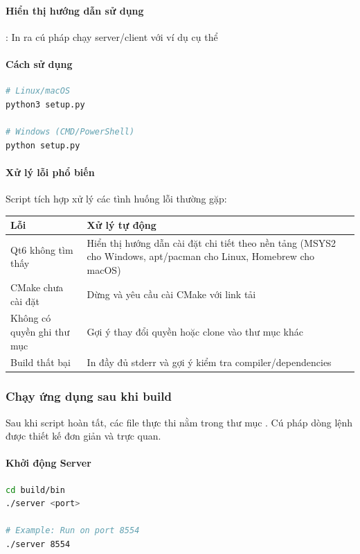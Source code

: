 \paragraph*{Hiển thị hướng dẫn sử dụng}: In ra cú pháp chạy server/client với ví dụ cụ thể

\paragraph*{Cách sử dụng}
\noindent

\begin{lstlisting}[language=bash, caption={Chạy script setup tự động}, label={lst:setup_script}]
# Linux/macOS
python3 setup.py

# Windows (CMD/PowerShell)
python setup.py
\end{lstlisting}

\paragraph{Xử lý lỗi phổ biến}
\noindent
Script tích hợp xử lý các tình huống lỗi thường gặp:

\noindent
\small
\begin{tabular}{p{}p{}}
\toprule
\textbf{Lỗi} & \textbf{Xử lý tự động} \\
\midrule
Qt6 không tìm thấy & Hiển thị hướng dẫn cài đặt chi tiết theo nền tảng (MSYS2 cho Windows, apt/pacman cho Linux, Homebrew cho macOS) \\
CMake chưa cài đặt & Dừng và yêu cầu cài CMake với link tải \\
Không có quyền ghi thư mục & Gợi ý thay đổi quyền hoặc clone vào thư mục khác \\
Build thất bại & In đầy đủ stderr và gợi ý kiểm tra compiler/dependencies \\
\bottomrule
\end{tabular}

\vspace{0.5em}

\subsubsection{Chạy ứng dụng sau khi build}

Sau khi script hoàn tất, các file thực thi nằm trong thư mục . Cú pháp dòng lệnh được thiết kế đơn giản và trực quan.

\paragraph{Khởi động Server}
\noindent
\begin{lstlisting}[language=bash, caption={Chạy server với port chỉ định}, label={lst:run_server}]
cd build/bin
./server <port>

# Example: Run on port 8554
./server 8554
\end{lstlisting}

